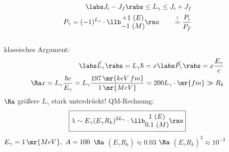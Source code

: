 \begin{align}
\begin{split}
\labs J_i - J_f \rabs \leq L_\gamma \leq J_i + J_f\\
P_\gamma = (-1)^{L_\gamma} \cdot \llb \begin{matrix}
+1 \ (E) \\ -1\ (M) \end{matrix}\rno\qquad \overset{!}{=} \frac{P_i}{P_f}
\end{split}
\end{align}
\\
\glqq klassisches Argument\grqq{}:
\begin{align*}
\labs \vec{L}_\gamma \rabs = L_\gamma \hbar = x \labs \vec{P}_\gamma \rabs = x \frac{E_\gamma}{c}\\
\Ra x = L_\gamma \frac{\hbar c}{E_\gamma} = L_\gamma \frac{197\,\mr{keV\,fm}}{1\,\mr{MeV}}= 200 L_\gamma \cdot \mr{fm} \gg R_k
\end{align*}
$\Ra$ größere $L_\gamma$ stark unterdrückt! QM-Rechnung:
\begin{align}
\boxed{ \lambda \sim E_\gamma (E_\gamma R_k)^{2L_\gamma}\cdot \llb \begin{matrix}
1 \ (E) \\ 0.1 \ (M)\end{matrix} \rno}
\end{align}
$E_\gamma = 1\,\mr{MeV}, \ A = 100$ $\Ra$ $(E_\gamma R_k) \approx 0.03$ $\Ra$ $(E_\gamma R_k)^2 \approx 10^{-3}$
